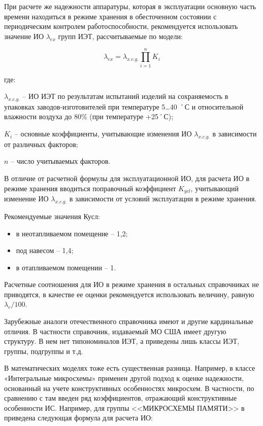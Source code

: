\documentclass[a4paper,14pt]{article}
\begin{document}
При расчете же надежности аппаратуры, которая в эксплуатации основную часть времени находиться в режиме хранения в обесточенном состоянии с периодическим контролем работоспособности, рекомендуется использовать значение ИО $\lambda_{ex}$ групп ИЭТ, рассчитываемые по модели:

\begin{equation}
	\lambda_{ex} = \lambda_{x.c.g.}  \prod_{i=1}^{n} K_i 
\end{equation}

где:

$\lambda_{x.c.g.}$ -- ИО ИЭТ по результатам испытаний изделий на сохраняемость в упаковках заводов-изготовителей при температуре 5…40 ˚С и относительной влажности воздуха до 80\% (при температуре +25˚С); 

$K_i$ – основные коэффициенты, учитывающие изменения ИО $\lambda_{x.c.g.}$ в зависимости от различных факторов; 

$n$ – число учитываемых факторов.

В отличие от расчетной формулы для эксплуатационной ИО, для расчета ИО в режиме хранения вводиться поправочный коэффициент $K_{ycl}$, учитывающий изменение ИО $\lambda_{x.c.g.}$ в зависимости от условий эксплуатации в режиме хранения.

Рекомендуемые значения Кусл:
\begin{itemize}
	\item в неотапливаемом помещение -- 1,2;
	\item под навесом -- 1,4;
	\item в отапливаемом помещении -- 1.
\end{itemize}

Расчетные соотношения для ИО в режиме хранения в остальных справочниках не приводятся, в качестве ее оценки рекомендуется использовать величину, равную $\lambda_{e}/100$.

Зарубежные аналоги отечественного справочника имеют и другие кардинальные отличия.
В частности справочник, издаваемый МО США имеет другую структуру.
В нем нет типономиналов ИЭТ, а приведены лишь классы ИЭТ, группы, подгруппы и т.д.

В математических моделях тоже есть существенная разница.
Например, в классе «Интегральные микросхемы» применен другой подход к оценке надежности, основанный на учете конструктивных особенностях микросхем.
В частности, по сравнению с там введен ряд коэффициентов, отражающий	конструктивные	особенности	ИС.
Например, для группы <<МИКРОСХЕМЫ ПАМЯТИ>> в приведена следующая формула для расчета ИО:
\end{document}
